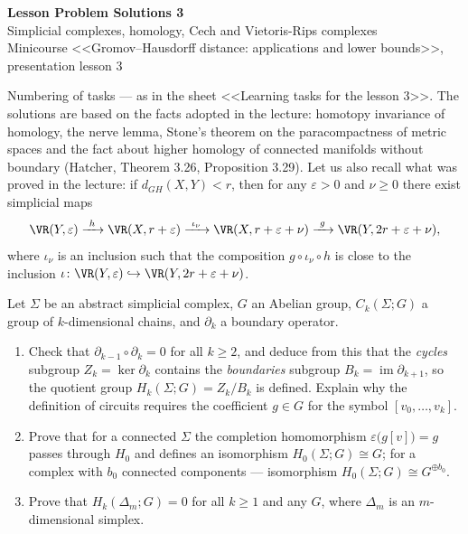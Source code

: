 \documentclass[a4paper,12pt]{report}
\begin{document}
\begin{center}
{\Large\bfseries Lesson Problem Solutions \textup{3}}\\[2mm]
{\large Simplicial complexes, homology, Cech and Vietoris-Rips complexes}\\[2mm]
{\small Minicourse <<Gromov--Hausdorff distance: applications and lower bounds>>, presentation lesson \textup{3}}
\end{center}

Numbering of tasks --- as in the sheet <<Learning tasks for the lesson \textup{3}>>. The solutions are based on the facts adopted in the lecture: homotopy invariance of homology, the nerve lemma, Stone's theorem on the paracompactness of metric spaces and the fact about higher homology of connected manifolds without boundary \textup{(}Hatcher, Theorem \textup{3.26}, Proposition \textup{3.29}\textup{)}. Let us also recall what was proved in the lecture: if $d_{GH}(X,Y)<r$, then for any $\varepsilon>0$ and $\nu\ge0$ there exist simplicial maps
\[
\VR(Y,\varepsilon)\xrightarrow{\ h\ }\VR(X,r+\varepsilon)\xrightarrow{\ \iota_\nu\ }\VR(X,r+\varepsilon+\nu)\xrightarrow{\ g\ }\VR(Y,2r+\varepsilon+\nu),
\]
where $\iota_\nu$ is an inclusion such that the composition $g\circ\iota_\nu\circ h$ is close to the inclusion $\iota\colon\VR(Y,\varepsilon)\hookrightarrow\VR(Y,2r+\varepsilon+\nu)$.

\begin{task}
Let $\Sigma$ be an abstract simplicial complex, $G$ an Abelian group, $C_k(\Sigma; G)$ a group of $k$-dimensional chains, and $\partial_k$ a boundary operator.
\begin{enumerate}[label=\textup{(\alph*)}]
\item Check that $\partial_{k-1} \circ \partial_k = 0$ for all $k \ge 2$, and deduce from this that the \emph{cycles} subgroup $Z_k = \ker \partial_k$ contains the \emph{boundaries} subgroup $B_k = \operatorname{im} \partial_{k+1}$, so the quotient group $H_k(\Sigma; G) = Z_k / B_k$ is defined. Explain why the definition of circuits requires the coefficient $g \in G$ for the symbol $[v_0, \dots, v_k]$.
\item Prove that for a connected $\Sigma$ the completion homomorphism $\varepsilon\bigl(g[v]\bigr) = g$ passes through $H_0$ and defines an isomorphism $H_0(\Sigma; G) \cong G$\textup{;} for a complex with $b_0$ connected components --- isomorphism $H_0(\Sigma; G) \cong G^{\oplus b_0}$.
\item Prove that $H_k(\Delta_m; G) = 0$ for all $k \ge 1$ and any $G$, where $\Delta_m$ is an $m$-dimensional simplex. 
\end{enumerate}
\end{task}
\end{document}
